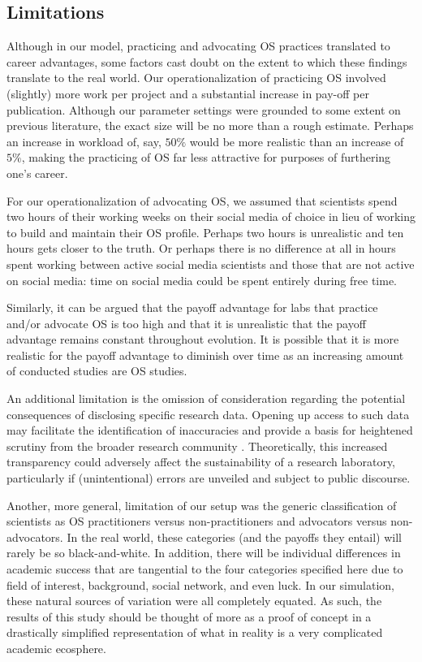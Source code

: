 \documentclass[meta, authordate]{jote-new-article}
\begin{document}
\subsection{Limitations}

Although in our model, practicing and advocating OS practices translated to career advantages, some factors cast doubt on the extent to which these findings translate to the real world. Our operationalization of practicing OS involved (slightly) more work per project and a substantial increase in pay-off per publication. Although our parameter settings were grounded to some extent on previous literature, the exact size will be no more than a rough estimate. Perhaps an increase in workload of, say, $50\%$ would be more realistic than an increase of $5\%$, making the practicing of OS far less attractive for purposes of furthering one's career.

For our operationalization of advocating OS, we assumed that scientists spend two hours of their working weeks on their social media of choice in lieu of working to build and maintain their OS profile. Perhaps two hours is unrealistic and ten hours gets closer to the truth. Or perhaps there is no difference at all in hours spent working between active social media scientists and those that are not active on social media: time on social media could be spent entirely during free time.

Similarly, it can be argued that the payoff advantage for labs that practice and/or advocate OS is too high and that it is unrealistic that the payoff advantage remains constant throughout evolution. It is possible that it is more realistic for the payoff advantage to diminish over time as an increasing amount of conducted studies are OS studies.

An additional limitation is the omission of consideration regarding the potential consequences of disclosing specific research data. Opening up access to such data may facilitate the identification of inaccuracies and provide a basis for heightened scrutiny from the broader research community \parencite{AllenMehler2019}. Theoretically, this increased transparency could adversely affect the sustainability of a research laboratory, particularly if  (unintentional) errors are unveiled and subject to public discourse.

Another, more general, limitation of our setup was the generic classification of scientists as OS practitioners versus non-practitioners and advocators versus non-advocators. In the real world, these categories (and the payoffs they entail) will rarely be so black-and-white. In addition, there will be individual differences in academic success that are tangential to the four categories specified here due to field of interest, background, social network, and even luck. In our simulation, these natural sources of variation were all completely equated. As such, the results of this study should be thought of more as a proof of concept in a drastically simplified representation of what in reality is a very complicated academic ecosphere.
\end{document}
